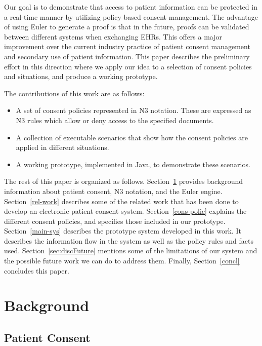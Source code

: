 \documentclass[conference]{IEEEtran}
\begin{document}
Our goal is to demonstrate that access to patient information can be protected in a real-time manner by utilizing policy based consent management.
The advantage of using Euler to generate a proof is that in the future, proofs can be validated between different systems when exchanging EHRs. This offers a
major improvement over the current industry practice of patient consent management and secondary use of patient information. This paper describes the
preliminary effort in this direction where we apply our idea to a selection of consent policies and situations, and produce a working prototype.


The contributions of this work are as follows: 

\begin{itemize}
    \item A set of consent policies represented in N3 notation. These are expressed as N3 rules which allow or deny access to the specified documents.

\item A collection of executable scenarios that show how the consent policies are applied in different situations.
\item A working prototype, implemented in Java, to demonstrate these scenarios.
\end{itemize}

The rest of this paper is organized as follows. Section~\ref{bg-sec} provides background information about patient consent, N3 notation, and the Euler engine.
Section~\ref{rel-work} describes some of the related work that has been done to develop an electronic patient consent system. Section~\ref{cons-polic} explains
the different consent policies, and specifies those included in our prototype. Section~\ref{main-sys} describes the prototype system developed in this
work. It describes the information flow in the system as well as the policy rules and facts used. Section~\ref{sec:discFuture} mentions some of the
limitations of our system and the possible future work we can do to address them. Finally, Section~\ref{concl} concludes this paper.


\section{Background}
\label{bg-sec}

\subsection{Patient Consent}
\label{pat-consent}
\end{document}
